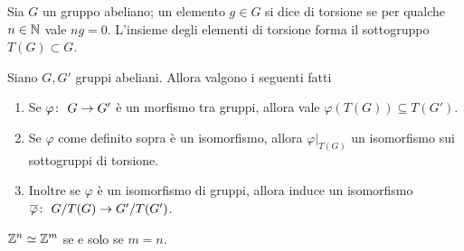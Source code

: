 \begin{definition}
	Sia $G$ un gruppo abeliano; un elemento $g \in G$ si dice di torsione se per qualche $n \in \mathbb{N}$ vale $ng = 0$. L'insieme degli elementi di torsione forma il sottogruppo $T(G) \subset G$.
\end{definition}

\begin{lemma}
	Siano $G, G'$ gruppi abeliani. Allora valgono i seguenti fatti
	\begin{enumerate}
		\item Se $\varphi \colon\ G \rightarrow G'$ è un morfismo tra gruppi, allora vale $\varphi(T(G)) \subseteq T(G')$.
		\item Se $\varphi$ come definito sopra è un isomorfismo, allora $\varphi|_{T(G)}$ un isomorfismo sui sottogruppi di torsione.
		\item Inoltre se $\varphi$ è un isomorfismo di gruppi, allora induce un isomorfismo $\overline{\varphi} \colon\ G/T(G) \rightarrow G'/T(G')$.  
	\end{enumerate}
\end{lemma}

\begin{proposition}
	$\mathbb{Z}^n \simeq \mathbb{Z}^m$ se e solo se $m = n$. 
\end{proposition}

